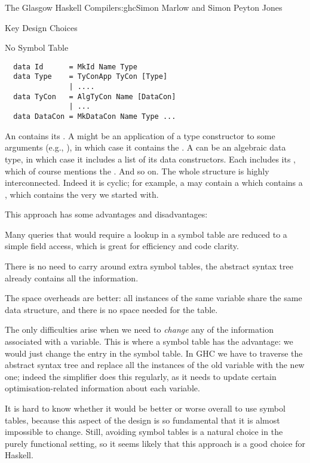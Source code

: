 \begin{aosachapter}{The Glasgow Haskell Compiler}{s:ghc}{Simon Marlow and Simon Peyton Jones}
\begin{aosasect1}{Key Design Choices}
\begin{aosasect2}{No Symbol Table}
\begin{verbatim}
  data Id      = MkId Name Type
  data Type    = TyConApp TyCon [Type]
               | ....
  data TyCon   = AlgTyCon Name [DataCon]
               | ...
  data DataCon = MkDataCon Name Type ...
\end{verbatim}

An  contains its .  A  might be an
application of a type constructor to some arguments (e.g., ), in which case it contains the .  A 
can be an algebraic data type, in which case it includes a list of its
data constructors.  Each  includes its ,
which of course mentions the .  And so on.  The whole
structure is highly interconnected.  Indeed it is cyclic; for example,
a  may contain a  which contains a
, which contains the very  we started with.

This approach has some advantages and disadvantages:

\begin{aosaitemize}

\item Many queries that would require a lookup in a symbol table are
  reduced to a simple field access, which is great for efficiency and
  code clarity.

\item There is no need to carry around extra symbol tables, the
  abstract syntax tree already contains all the information.

\item The space overheads are better: all instances of the same
  variable share the same data structure, and there is no space needed
  for the table.

\item The only difficulties arise when we need to \emph{change} any of
  the information associated with a variable.  This is where a symbol
  table has the advantage: we would just change the entry in the
  symbol table.  In GHC we have to traverse the abstract syntax tree
  and replace all the instances of the old variable with the new one;
  indeed the simplifier does this regularly, as it needs to update
  certain optimisation-related information about each variable.

\end{aosaitemize}

It is hard to know whether it would be better or worse overall to use
symbol tables, because this aspect of the design is so fundamental
that it is almost impossible to change.  Still, avoiding symbol tables
is a natural choice in the purely functional setting, so it seems
likely that this approach is a good choice for Haskell.


\end{aosasect2}
\end{aosasect1}
\end{aosachapter}
